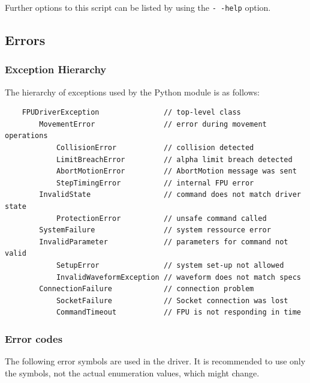 \documentclass[11pt,a4paper]{scrartcl}
\begin{document}
Further options to this script can be listed by using the
\texttt{-\,-help} option.


\subsection{Errors}
\label{sec:errors}

\subsubsection{Exception Hierarchy}
\label{sec:ExceptionsReference}
The hierarchy of exceptions used by the Python module is as follows:

\begin{verbatim}
    FPUDriverException               // top-level class
        MovementError                // error during movement operations
            CollisionError           // collision detected
            LimitBreachError         // alpha limit breach detected
            AbortMotionError         // AbortMotion message was sent
            StepTimingError          // internal FPU error
        InvalidState                 // command does not match driver state
            ProtectionError          // unsafe command called
        SystemFailure                // system ressource error
        InvalidParameter             // parameters for command not valid
            SetupError               // system set-up not allowed
            InvalidWaveformException // waveform does not match specs
        ConnectionFailure            // connection problem
            SocketFailure            // Socket connection was lost
            CommandTimeout           // FPU is not responding in time

\end{verbatim}

\subsubsection{Error codes}
\label{sec:errorcodes}

The following error symbols are used in the driver.  It is recommended
to use only the symbols, not the actual enumeration values, which
might change.
\end{document}

